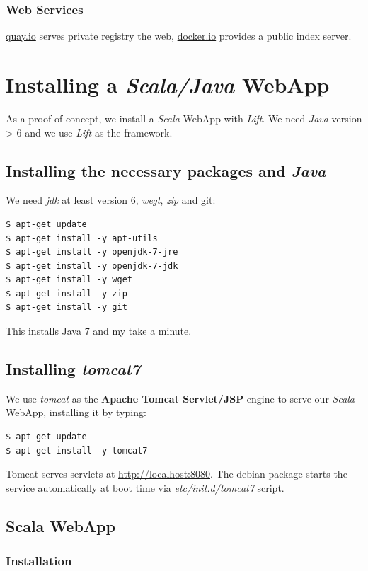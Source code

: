 \documentclass[11pt]{article}
\begin{document}
\subsubsection{Web Services}
\label{sec-3-6-2}

\href{https://quay.io/}{quay.io} serves private registry the web, \href{https://index.docker.io/}{docker.io} provides a public index server.
\section{Installing a \emph{Scala/Java} WebApp}
\label{sec-4}

As a proof of concept, we install a \emph{Scala} WebApp with \emph{Lift}. We need \emph{Java} version > 6 and we use \emph{Lift} as the framework. 
\subsection{Installing the necessary packages and \emph{Java}}
\label{sec-4-1}

We need \emph{jdk} at least version 6, \emph{wegt}, \emph{zip} and git:

\begin{verbatim}
$ apt-get update
$ apt-get install -y apt-utils
$ apt-get install -y openjdk-7-jre
$ apt-get install -y openjdk-7-jdk
$ apt-get install -y wget
$ apt-get install -y zip
$ apt-get install -y git
\end{verbatim}
This installs Java 7 and my take a minute.
\subsection{Installing \emph{tomcat7}}
\label{sec-4-2}

We use \emph{tomcat} as the \textbf{Apache Tomcat Servlet/JSP} engine to serve our \emph{Scala} WebApp, installing it by typing:

\begin{verbatim}
$ apt-get update
$ apt-get install -y tomcat7
\end{verbatim}
Tomcat serves servlets  at \href{http://localhost:8080}{http://localhost:8080}. The debian package starts the service automatically at boot time via \emph{etc/init.d/tomcat7} script.
\subsection{Scala WebApp}
\label{sec-4-3}
\subsubsection{Installation}
\label{sec-4-3-1}
\end{document}
